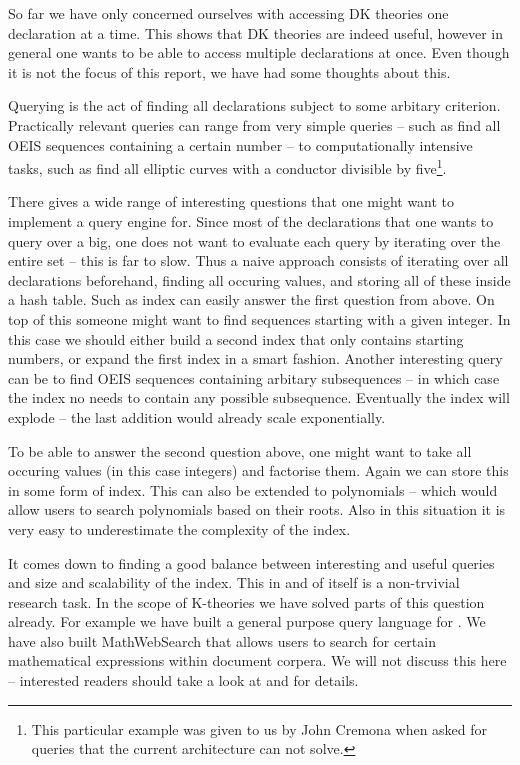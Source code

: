 So far we have only concerned ourselves with accessing DK theories one declaration at a
time. This shows that DK theories are indeed useful, however in general one wants to be
able to access multiple declarations at once. Even though it is not the focus of this
report, we have had some thoughts about this.

Querying is the act of finding all declarations subject to some arbitary
criterion. Practically relevant queries can range from very simple queries -- such as find
all OEIS sequences containing a certain number -- to computationally intensive tasks, such
as find all elliptic curves with a conductor divisible by five\footnote{This particular
  example was given to us by John Cremona when asked for queries that the current
  architecture can not solve. }.

There gives a wide range of interesting questions that one might want to implement a query
engine for. Since most of the declarations that one wants to query over a big, one does
not want to evaluate each query by iterating over the entire set -- this is far to
slow. Thus a naive approach consists of iterating over all declarations beforehand,
finding all occuring values, and storing all of these inside a hash table. Such as index
can easily answer the first question from above. On top of this someone might want to find
sequences starting with a given integer. In this case we should either build a second
index that only contains starting numbers, or expand the first index in a smart
fashion. Another interesting query can be to find OEIS sequences containing arbitary
subsequences -- in which case the index no needs to contain any possible
subsequence. Eventually the index will explode -- the last addition would already scale
exponentially.

To be able to answer the second question above, one might want to take all occuring values
(in this case integers) and factorise them. Again we can store this in some form of
index. This can also be extended to polynomials -- which would allow users to search
polynomials based on their roots. Also in this situation it is very easy to underestimate
the complexity of the index.

It comes down to finding a good balance between interesting and useful queries and size
and scalability of the index. This in and of itself is a non-trvivial research task. In
the scope of K-theories we have solved parts of this question already. For example we have
built a general purpose query language for \MMT. We have also built MathWebSearch that
allows users to search for certain mathematical expressions within document corpera. We
will not discuss this here -- interested readers should take a look at \cite{Rabe:qlfml12}
and \cite{ODK-D6.1} for details.

